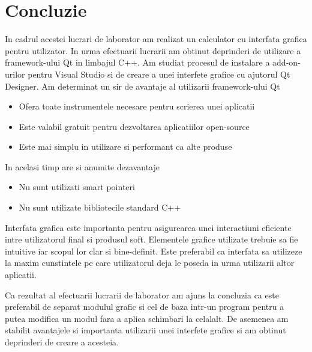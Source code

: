 \section*{Concluzie}


	In cadrul acestei lucrari de laborator am realizat un calculator cu interfata grafica pentru utilizator. In urma efectuarii lucrarii am obtinut deprinderi de utilizare a framework-ului Qt in limbajul C++. Am studiat procesul de instalare a add-on-urilor pentru Visual Studio si de creare a unei interfete grafice cu ajutorul Qt Designer.
	Am determinat un sir de avantaje al utilizarii framework-ului Qt
	\begin{itemize}
	
	\item Ofera toate instrumentele necesare pentru scrierea unei aplicatii
	\item Este valabil gratuit pentru dezvoltarea aplicatiilor open-source
	\item Este mai simplu in utilizare si performant ca alte produse
	
	\end{itemize}

	In acelasi timp are si anumite dezavantaje
	\begin{itemize}
	
	\item Nu sunt utilizati smart pointeri
	\item Nu sunt utilizate bibliotecile standard C++
	
	\end{itemize}

Interfata grafica este importanta pentru asigurearea unei interactiuni eficiente intre utilizatorul final si produsul soft. Elementele grafice utilizate trebuie sa fie intuitive iar scopul lor clar si bine-definit. Este preferabil ca interfata sa utilizeze la maxim cunstintele pe care utilizatorul deja le poseda in urma utilizarii altor aplicatii.

	Ca rezultat al efectuarii lucrarii de laborator am ajuns la concluzia ca este preferabil de separat modulul grafic si cel de baza intr-un program pentru a putea modifica un modul fara a aplica schimbari la celalalt. De asemenea am stabilit avantajele si importanta utilizarii unei interfete grafice si am obtinut deprinderi de creare a acesteia.

\clearpage